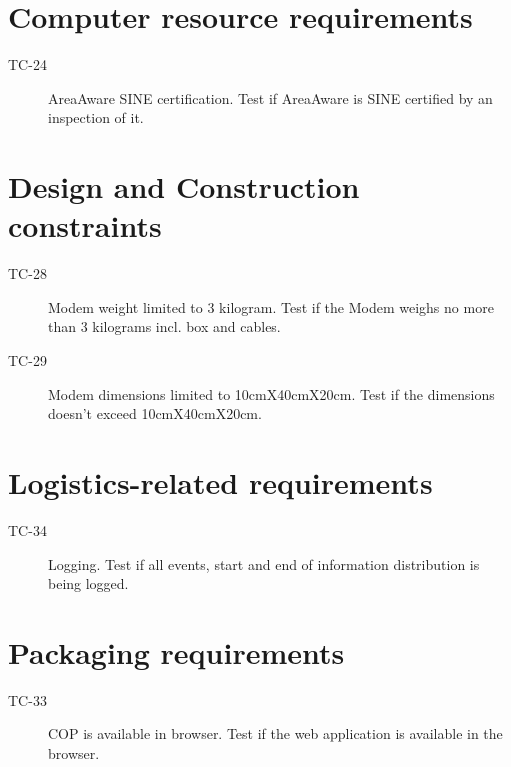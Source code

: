 \section{Computer resource requirements}
\begin{description}
	\item[TC-24] AreaAware SINE certification. Test if AreaAware is SINE certified by an inspection of it.
\end{description}

\section{Design and Construction constraints}
\begin{description}
	\item[TC-28] Modem weight limited to 3 kilogram. Test if the Modem weighs no more than 3 kilograms incl. box and cables.
	\item[TC-29] Modem dimensions limited to 10cmX40cmX20cm. Test if the dimensions doesn't exceed 10cmX40cmX20cm.
\end{description}

\section{Logistics-related requirements}
\begin{description}
	\item[TC-34] Logging. Test if all events, start and end of information distribution is being logged.
\end{description}

\section{Packaging requirements}
\begin{description}
	\item[TC-33] COP is available in browser. Test if the web application is available in the browser.
\end{description}